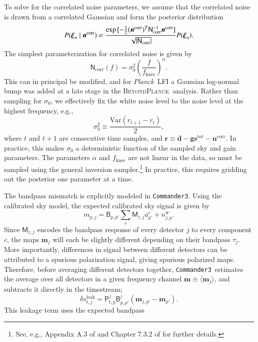 \documentclass[twocolumn]{../../common/aa}
\def\Planck{\emph{Planck}}
\def\commanderthree{\texttt{Commander3}}
\newcommand{\n}[0]{\vec{n}}
\newcommand{\N}[0]{\tens{N}}
\newcommand{\bp}{\textsc{BeyondPlanck}}
\begin{document}
To solve for the correlated noise parameters, we assume that the correlated noise is drawn from a correlated Gaussian and form the posterior distribution
\begin{equation}
	P(\boldsymbol\xi_n\mid\n^\mathrm{corr})\propto\frac{\exp{[-\frac12(\n^\mathrm{corr})^T\N_\mathrm{corr}^{-1}\n^\mathrm{corr}]}}
	{\sqrt{|\N_\mathrm{corr}|}}P(\boldsymbol\xi_n).
\end{equation}
The simplest parameterization for correlated noise is given by
\begin{equation}
	\mathsf N_\mathrm{corr}(f)=\sigma_0^2\left(\frac f{f_\mathrm{knee}}\right)^\alpha.
\end{equation}
This can in principal be modified, and for \Planck\ LFI a Gaussian log-normal bump was added at a late stage in the \bp\ analysis. Rather than sampling for $\sigma_0$, we effectively fix the white noise level to the noise level at the highest frequency, e.g.,
\begin{equation}
	\sigma_0^2\equiv\frac{\mathrm{Var}(r_{t+1}-r_t)}2,
\end{equation}
where $t$ and $t+1$ are consecutive time samples, and ${\boldsymbol r\equiv\boldsymbol d-\boldsymbol g\boldsymbol s^\mathrm{tot}
-\boldsymbol n^\mathrm{corr}}$. In practice, this makes $\sigma_0$ a deterministic function of the sampled sky and gain parameters. The parameters $\alpha$ and $f_\mathrm{knee}$ are not linear in the data, so must be sampled using the general inversion sampler.\footnote{See, e.g., Appendix A.3 of \citet{bp01} and Chapter 7.3.2 of \citet{numerical_recipes} for further details.} In practice, this requires gridding out the posterior one parameter at a time.

The bandpass mismatch is explicitly modeled in \commanderthree. Using the calibrated sky model, the expected calibrated sky signal is given by
\begin{equation}
	m_{p,j}=\mathsf B_{p,p'}\sum_c\mathsf M_{c,j}a^c_{p'}+n_{j,p}^\mathrm w.
\end{equation}
Since $\mathsf M_{c,j}$ encodes the bandpass response of every detector $j$ to every component $c$, the maps $\boldsymbol m_j$ will each be slightly different depending on their bandpass $\tau_j$. More importantly, differences in signal between different detectors can be attributed to a spurious polarization signal, giving spurious polarized maps. Therefore, before averaging different detectors together, \commanderthree\ estimates the average over all detectors in a given frequency channel $\boldsymbol m\equiv \langle \boldsymbol m_j\rangle$, and subtracts it directly in the timestream;
\begin{equation}
	\delta s_{t,j}^\mathrm{leak}=\mathsf P_{t,p}^j\mathsf B_{p,p'}^j\left(\boldsymbol m_{j,p'}-\boldsymbol m_{p'}\right).
\end{equation}
This leakage term uses the expected bandpass
\end{document}
